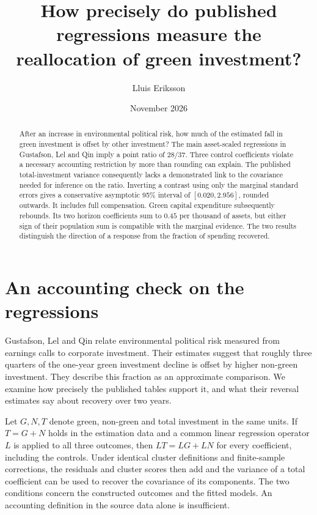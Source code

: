 \documentclass[11pt]{article}
\title{How precisely do published regressions measure the reallocation of green investment?}
\author{Lluis Eriksson}
\date{November 2026}
\begin{document}
\maketitle
\begin{abstract}
After an increase in environmental political risk, how much of the estimated fall in green investment is offset by other investment? The main asset-scaled regressions in Gustafson, Lel and Qin imply a point ratio of $28/37$. Three control coefficients violate a necessary accounting restriction by more than rounding can explain. The published total-investment variance consequently lacks a demonstrated link to the covariance needed for inference on the ratio. Inverting a contrast using only the marginal standard errors gives a conservative asymptotic 95\% interval of $[0.020,2.956]$, rounded outwards. It includes full compensation. Green capital expenditure subsequently rebounds. Its two horizon coefficients sum to $0.45$ per thousand of assets, but either sign of their population sum is compatible with the marginal evidence. The two results distinguish the direction of a response from the fraction of spending recovered.
\end{abstract}

\section{An accounting check on the regressions}
Gustafson, Lel and Qin \cite{glq} relate environmental political risk measured from earnings calls to corporate investment. Their estimates suggest that roughly three quarters of the one-year green investment decline is offset by higher non-green investment. They describe this fraction as an approximate comparison. We examine how precisely the published tables support it, and what their reversal estimates say about recovery over two years.

Let $G,N,T$ denote green, non-green and total investment in the same units. If $T=G+N$ holds in the estimation data and a common linear regression operator $L$ is applied to all three outcomes, then $LT=LG+LN$ for every coefficient, including the controls. Under identical cluster definitions and finite-sample corrections, the residuals and cluster scores then add and the variance of a total coefficient can be used to recover the covariance of its components. The two conditions concern the constructed outcomes and the fitted models. An accounting definition in the source data alone is insufficient.
\end{document}
